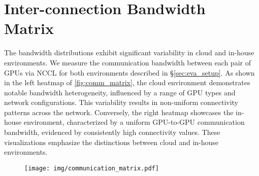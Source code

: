 
\section{Inter-connection Bandwidth Matrix}
\label{appendix:comm_matrix}
The bandwidth distributions exhibit significant variability in cloud and in-house environments. We measure the communication bandwidth between each pair of GPUs via NCCL for both environments described in \S\ref{sec:eva_setup}. As shown in the left heatmap of \autoref{fig:comm_matrix}, the cloud environment demonstrates notable bandwidth heterogeneity, influenced by a range of GPU types and network configurations. This variability results in non-uniform connectivity patterns across the network. Conversely, the right heatmap showcases the in-house environment, characterized by a uniform GPU-to-GPU communication bandwidth, evidenced by consistently high connectivity values. These visualizations emphasize the distinctions between cloud and in-house environments.

\begin{figure}[!t] 
  \centering
  \texttt{[image: img/communication\_matrix.pdf]} %
  \caption{}
  \label{fig:comm_matrix}
\end{figure}

